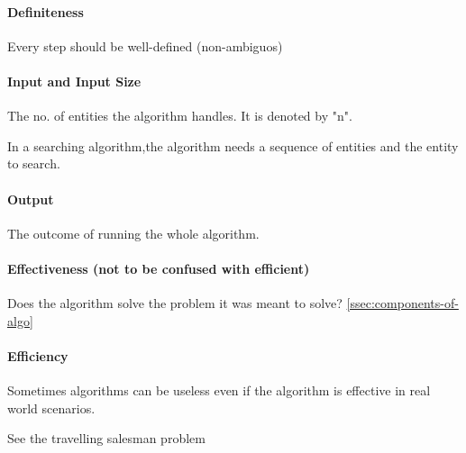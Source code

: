 \paragraph{Definiteness} Every step should be well-defined (non-ambiguos)
\paragraph{Input and Input Size}
The no. of entities the algorithm handles. It is denoted by "n".
\begin{eg}
  In a searching algorithm,the algorithm needs a sequence of entities and the
  entity to search.
\end{eg}
\paragraph{Output} The outcome of running the whole algorithm.

\paragraph{Effectiveness (not to be confused with efficient)}
Does the algorithm solve the problem it was meant to
solve? \autoref{ssec:components-of-algo}

\paragraph{Efficiency}
Sometimes algorithms can be useless even if the algorithm is effective in
real world scenarios.
\begin{eg}
  See the travelling salesman problem 
  \begin{problem}
    \label{prob:travelling-salesman}
  \end{problem}
\end{eg}

